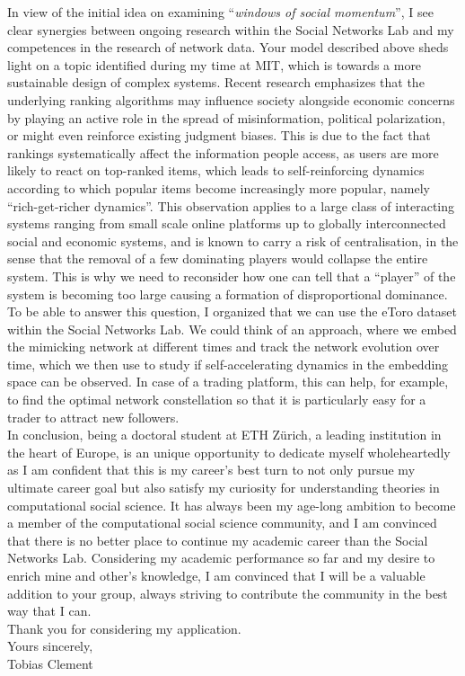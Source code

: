 In view of the initial idea on examining ``\textit{windows of social momentum}'', I see clear synergies between ongoing research within the Social Networks Lab and my competences in the research of network data. 
Your model described above sheds light on a topic identified during my time at MIT, which is towards a more sustainable design of complex systems. 
Recent research \cite{germano2019few} emphasizes that the underlying ranking algorithms may influence society alongside economic concerns by playing an active role in the spread of misinformation, political polarization, or might even reinforce existing judgment biases.
This is due to the fact that rankings systematically affect the information people access, as users are more likely to react on top-ranked items, which leads to self-reinforcing dynamics according to which popular items become increasingly more popular, namely ``rich-get-richer dynamics''. 
This observation applies to a large class of interacting systems ranging from small scale online platforms up to globally interconnected social and economic systems, and is known to carry a risk of centralisation, in the sense that the removal of a few dominating players would collapse the entire system. 
This is why we need to reconsider how one can tell that a ``player'' of the system is becoming too large causing a formation of disproportional dominance. 
To be able to answer this question, I organized that we can use the eToro dataset within the Social Networks Lab.
We could think of an approach, where we embed the mimicking network at different times and track the network evolution over time, which we then use to study if self-accelerating dynamics in the embedding space can be observed. 
In case of a trading platform, this can help, for example, to find the optimal network constellation so that it is particularly easy for a trader to attract new followers.\\

In conclusion, being a doctoral student at ETH Zürich, a leading institution in the heart of Europe, is an unique opportunity to dedicate myself wholeheartedly as I am confident that this is my career's best turn to not only pursue my ultimate career goal but also satisfy my curiosity for understanding theories in computational social science. 
It has always been my age-long ambition to become a member of the computational social science community, and I am convinced that there is no better place to continue my academic career than the Social Networks Lab. 
Considering my academic performance so far and my desire to enrich mine and other's knowledge, I am convinced that I will be a valuable addition to your group, always striving to contribute the community in the best way that I can.\\

Thank you for considering my application.\\

Yours sincerely,\\
Tobias Clement\\\\\